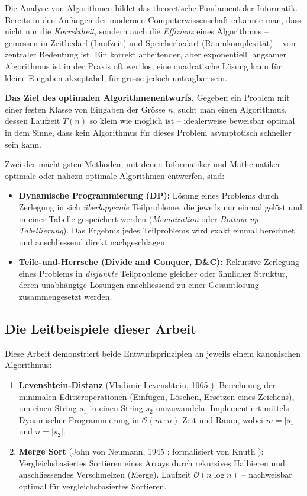 ﻿\documentclass[a4paper,12pt]{article}
\theoremstyle{definition}
\begin{document}
Die Analyse von Algorithmen bildet das theoretische Fundament der Informatik. Bereits
in den Anfängen der modernen Computerwissenschaft erkannte man, dass nicht nur die
\emph{Korrektheit}, sondern auch die \emph{Effizienz} eines Algorithmus -- gemessen
in Zeitbedarf (Laufzeit) und Speicherbedarf (Raumkomplexität) -- von zentraler
Bedeutung ist. Ein korrekt arbeitender, aber exponentiell langsamer Algorithmus ist
in der Praxis oft wertlos; eine quadratische Lösung kann für kleine Eingaben
akzeptabel, für grosse jedoch untragbar sein.

\textbf{Das Ziel des optimalen Algorithmenentwurfs.}
Gegeben ein Problem mit einer festen Klasse von Eingaben der Grösse $n$, sucht man
einen Algorithmus, dessen Laufzeit $T(n)$ so klein wie möglich ist -- idealerweise
beweisbar optimal in dem Sinne, dass kein Algorithmus für dieses Problem
asymptotisch schneller sein kann.

Zwei der mächtigsten Methoden, mit denen Informatiker und Mathematiker optimale
oder nahezu optimale Algorithmen entwerfen, sind:
\begin{itemize}
    \item \textbf{Dynamische Programmierung (DP):} Lösung eines Problems durch
          Zerlegung in sich \emph{überlappende} Teilprobleme, die jeweils nur
          einmal gelöst und in einer Tabelle gespeichert werden
          (\textit{Memoization} oder \textit{Bottom-up-Tabellierung}).
          Das Ergebnis jedes Teilproblems wird exakt einmal berechnet und
          anschliessend direkt nachgeschlagen.
    \item \textbf{Teile-und-Herrsche (Divide and Conquer, D\&C):}
          Rekursive Zerlegung eines Problems in \emph{disjunkte} Teilprobleme
          gleicher oder ähnlicher Struktur, deren unabhängige Lösungen anschliessend
          zu einer Gesamtlösung zusammengesetzt werden.
\end{itemize}

\subsection{Die Leitbeispiele dieser Arbeit}

Diese Arbeit demonstriert beide Entwurfsprinzipien an jeweils einem kanonischen
Algorithmus:

\begin{enumerate}
    \item \textbf{Levenshtein-Distanz} (Vladimir Levenshtein, 1965
          \cite{levenshtein1965}): Berechnung der minimalen Editieroperationen
          (Einfügen, Löschen, Ersetzen eines Zeichens), um einen String $s_1$
          in einen String $s_2$ umzuwandeln. Implementiert mittels Dynamischer
          Programmierung in $\mathcal{O}(m \cdot n)$ Zeit und Raum,
          wobei $m = |s_1|$ und $n = |s_2|$.
    \item \textbf{Merge Sort} (John von Neumann, 1945 \cite{vonneumann1945};
          formalisiert von Knuth \cite{knuth1998}): Vergleichsbasiertes Sortieren
          eines Arrays durch rekursives Halbieren und anschliessendes Verschmelzen
          (Merge). Laufzeit $\mathcal{O}(n \log n)$ -- nachweisbar optimal für
          vergleichsbasiertes Sortieren.
\end{enumerate}
\end{document}
